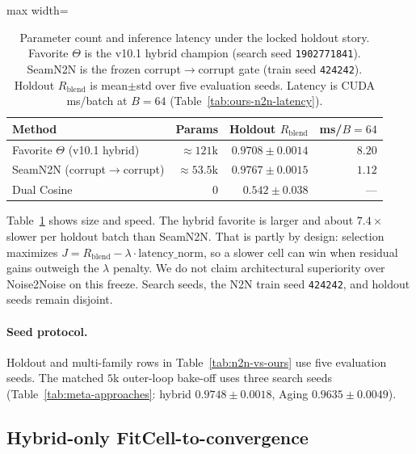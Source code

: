 \begin{table}[htbp]
  \centering
  \caption{Parameter count and inference latency under the locked holdout story.
    Favorite $\Theta$ is the v10.1 hybrid champion (search seed \texttt{1902771841}).
    SeamN2N is the frozen corrupt$\to$corrupt gate (train seed \texttt{424242}).
    Holdout $R_{\mathrm{blend}}$ is mean$\pm$std over five evaluation seeds.
    Latency is CUDA ms/batch at $B{=}64$ (Table~\ref{tab:ours-n2n-latency}).}
  \label{tab:param-fairness}
  \setlength{\tabcolsep}{4pt}
  \begin{adjustbox}{max width=\columnwidth}
\begin{tabular}{@{}lrrr@{}}
    \toprule
    Method & Params & Holdout $R_{\mathrm{blend}}$ & ms/$B{=}64$ \\
    \midrule
    Favorite $\Theta$ (v10.1 hybrid) & ${\approx}121$k & $0.9708{\pm}0.0014$ & $8.20$ \\
    SeamN2N (corrupt$\to$corrupt) & ${\approx}53.5$k & $0.9767{\pm}0.0015$ & $1.12$ \\
    Dual Cosine & $0$ & $0.542{\pm}0.038$ & --- \\
    \bottomrule
  \end{tabular}
\end{adjustbox}
\end{table}

Table~\ref{tab:param-fairness} shows size and speed.
The hybrid favorite is larger and about $7.4\times$ slower per holdout batch than SeamN2N.
That is partly by design: selection maximizes $J=R_{\mathrm{blend}}-\lambda\cdot\mathrm{latency\_norm}$,
so a slower cell can win when residual gains outweigh the $\lambda$ penalty.
We do not claim architectural superiority over Noise2Noise on this freeze.
Search seeds, the N2N train seed \texttt{424242}, and holdout seeds remain disjoint.

\paragraph{Seed protocol.}
Holdout and multi-family rows in Table~\ref{tab:n2n-vs-ours} use five evaluation seeds.
The matched $5$k outer-loop bake-off uses three search seeds
(Table~\ref{tab:meta-approaches}: hybrid $0.9748{\pm}0.0018$, Aging $0.9635{\pm}0.0049$).

\subsection{Hybrid-only FitCell-to-convergence}
\label{sec:v14-converge}
\label{sec:v14-hybrid-converge}

